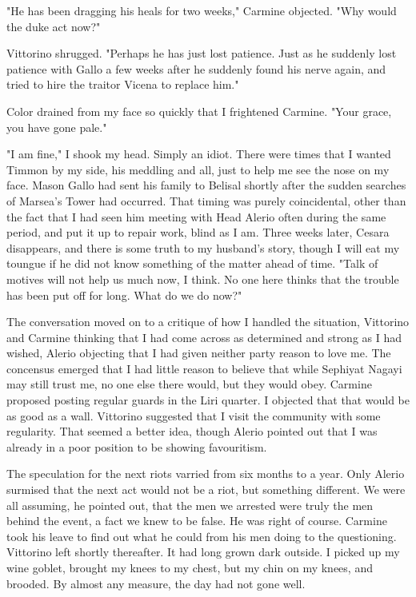 \documentclass{article}
\begin{document}
"He has been dragging his heals for two weeks," Carmine objected. "Why would the duke act now?"

Vittorino shrugged. "Perhaps he has just lost patience. Just as he suddenly lost patience with Gallo a few weeks after he suddenly found his nerve again, and tried to hire the traitor Vicena to replace him."

Color drained from my face so quickly that I frightened Carmine. "Your grace, you have gone pale."

"I am fine," I shook my head. Simply an idiot. There were times that I wanted Timmon by my side, his meddling and all, just to help me see the nose on my face. Mason Gallo had sent his family to Belisal shortly after the sudden searches of Marsea's Tower had occurred. That timing was purely coincidental, other than the fact that I had seen him meeting with Head Alerio often during the same period, and put it up to repair work, blind as I am. Three weeks later, Cesara disappears, and there is some truth to my husband's story, though I will eat my toungue if he did not know something of the matter ahead of time. "Talk of motives will not help us much now, I think. No one here thinks that the trouble has been put off for long. What do we do now?"

The conversation moved on to a critique of how I handled the situation, Vittorino and Carmine thinking that I had come across as determined and strong as I had wished, Alerio objecting that I had given neither party reason to love me. The concensus emerged that I had little reason to believe that while Sephiyat Nagayi may still trust me, no one else there would, but they would obey. Carmine proposed posting regular guards in the Liri quarter. I objected that that would be as good as a wall. Vittorino suggested that I visit the community with some regularity. That seemed a better idea, though Alerio pointed out that I was already in a poor position to be showing favouritism.

The speculation for the next riots varried from six months to a year. Only Alerio surmised that the next act would not be a riot, but something different. We were all assuming, he pointed out, that the men we arrested were truly the men behind the event, a fact we knew to be false. He was right of course. Carmine took his leave to find out what he could from his men doing to the questioning. Vittorino left shortly thereafter. It had long grown dark outside. I picked up my wine goblet, brought my knees to my chest, but my chin on my knees, and brooded. By almost any measure, the day had not gone well.
\end{document}
